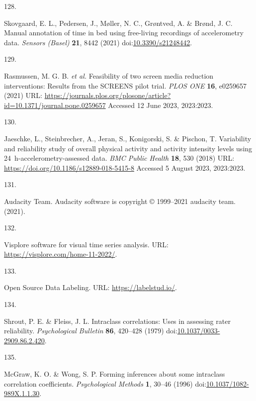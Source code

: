\documentclass[
  10pt,
]{scrbook}
\newlength{\cslhangindent}
\newlength{\csllabelwidth}
\newlength{\cslentryspacingunit} %
\newenvironment{CSLReferences}[2] %
 {%
  \setlength{\parindent}{0pt}
  \ifodd #1
  \let\oldpar\par
  \def\par{\hangindent=\cslhangindent\oldpar}
  \fi
  \setlength{\parskip}{#2\cslentryspacingunit}
 }%
 {}
\newcommand{\CSLLeftMargin}[1]{\parbox[t]{\csllabelwidth}{#1}}
\newcommand{\CSLRightInline}[1]{\parbox[t]{\linewidth - \csllabelwidth}{#1}\break}
\let\originaltextbf\textbf
\renewcommand{\textbf}[1]{\textcolor{color1}{\originaltextbf{#1}}}
\begin{document}
\begin{CSLReferences}{0}{0}
\leavevmode{}%
\CSLLeftMargin{128. }%
\CSLRightInline{Skovgaard, E. L., Pedersen, J., Møller, N. C., Grøntved,
A. \& Brønd, J. C. Manual annotation of time in bed using free-living
recordings of accelerometry data. \emph{Sensors (Basel)} \textbf{21},
8442 (2021)
doi:\href{https://doi.org/10.3390/s21248442}{10.3390/s21248442}.}

\leavevmode{}%
\CSLLeftMargin{129. }%
\CSLRightInline{Rasmussen, M. G. B. \emph{et al.} Feasibility of two
screen media reduction interventions: Results from the {SCREENS} pilot
trial. \emph{{PLOS} {ONE}} \textbf{16}, e0259657 (2021) URL:
\url{https://journals.plos.org/plosone/article?id=10.1371/journal.pone.0259657}
Accessed 12 June 2023, 2023:2023.}

\leavevmode{}%
\CSLLeftMargin{130. }%
\CSLRightInline{Jaeschke, L., Steinbrecher, A., Jeran, S., Konigorski,
S. \& Pischon, T. Variability and reliability study of overall physical
activity and activity intensity levels using 24~h-accelerometry-assessed
data. \emph{{BMC} Public Health} \textbf{18}, 530 (2018) URL:
\url{https://doi.org/10.1186/s12889-018-5415-8} Accessed 5 August 2023,
2023:2023.}

\leavevmode{}%
\CSLLeftMargin{131. }%
\CSLRightInline{Audacity Team. Audacity\textregistered{} software is
copyright © 1999--2021 audacity team. (2021).}

\leavevmode{}%
\CSLLeftMargin{132. }%
\CSLRightInline{Visplore {\textendash} software for visual time series
analysis. URL: \url{https://visplore.com/home-11-2022/}.}

\leavevmode{}%
\CSLLeftMargin{133. }%
\CSLRightInline{Open Source Data Labeling. URL:
\url{https://labelstud.io/}.}

\leavevmode{}%
\CSLLeftMargin{134. }%
\CSLRightInline{Shrout, P. E. \& Fleiss, J. L. Intraclass correlations:
Uses in assessing rater reliability. \emph{Psychological Bulletin}
\textbf{86}, 420--428 (1979)
doi:\href{https://doi.org/10.1037/0033-2909.86.2.420}{10.1037/0033-2909.86.2.420}.}

\leavevmode{}%
\CSLLeftMargin{135. }%
\CSLRightInline{McGraw, K. O. \& Wong, S. P. Forming inferences about
some intraclass correlation coefficients. \emph{Psychological Methods}
\textbf{1}, 30--46 (1996)
doi:\href{https://doi.org/10.1037/1082-989X.1.1.30}{10.1037/1082-989X.1.1.30}.}


\end{CSLReferences}
\end{document}
